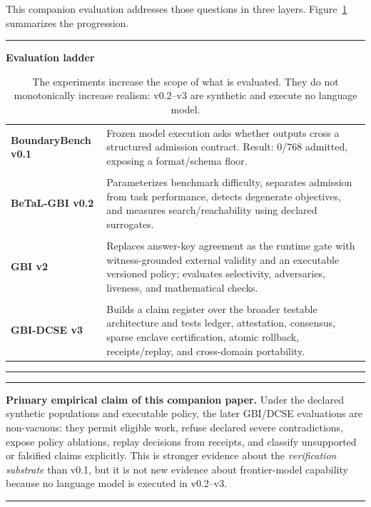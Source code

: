 \documentclass[11pt]{article}
\newenvironment{claimbox}{%
  \begin{center}\begin{minipage}{0.94\linewidth}\color{navy}\hrule\vspace{0.6em}\color{black}\small
}{%
  \vspace{0.5em}\color{navy}\hrule\end{minipage}\end{center}
}
\begin{document}
\newpage

This companion evaluation addresses those questions in three layers. Figure~\ref{fig:ladder} summarizes the progression.

\begin{table}[H]
\centering
\begin{minipage}{0.92\linewidth}
\color{navy}\hrule\vspace{0.6em}\color{black}
\centering
\textbf{Evaluation ladder}\\[0.7em]
\begin{tabularx}{\linewidth}{>{\bfseries}l >{\RaggedRight\arraybackslash}X}
BoundaryBench v0.1 & Frozen model execution asks whether outputs cross a structured admission contract. Result: 0/768 admitted, exposing a format/schema floor. \\[0.6em]  \vspace{-0.4em} \\
BeTaL-GBI v0.2 & Parameterizes benchmark difficulty, separates admission from task performance, detects degenerate objectives, and measures search/reachability using declared surrogates. \\[0.6em]  \vspace{-0.4em} \\
GBI v2 & Replaces answer-key agreement as the runtime gate with witness-grounded external validity and an executable versioned policy; evaluates selectivity, adversaries, liveness, and mathematical checks. \\[0.6em]  \vspace{-0.4em} \\
GBI-DCSE v3 & Builds a claim register over the broader testable architecture and tests ledger, attestation, consensus, sparse enclave certification, atomic rollback, receipts/replay, and cross-domain portability.
\end{tabularx}
\vspace{0.5em}\color{navy}\hrule\color{black}
\end{minipage}
\caption{The experiments increase the scope of what is evaluated. They do not monotonically increase realism: v0.2--v3 are synthetic and execute no language model.}
\label{fig:ladder}
\end{table}

\begin{claimbox}
\textbf{Primary empirical claim of this companion paper.} Under the declared synthetic populations and executable policy, the later GBI/DCSE evaluations are non-vacuous: they permit eligible work, refuse declared severe contradictions, expose policy ablations, replay decisions from receipts, and classify unsupported or falsified claims explicitly. This is stronger evidence about the \emph{verification substrate} than v0.1, but it is not new evidence about frontier-model capability because no language model is executed in v0.2--v3.
\end{claimbox}
\end{document}
